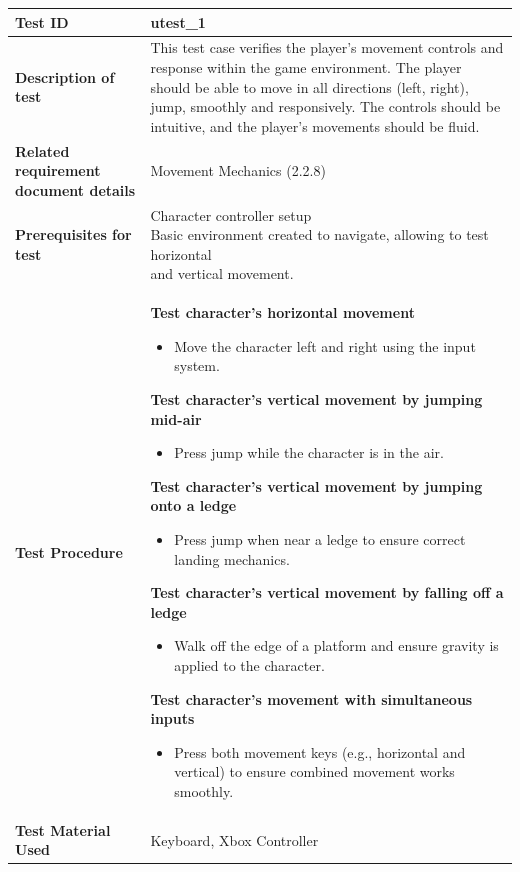 \documentclass[11pt, a4paper]{article}
\begin{document}
\begin{tabularx}{\linewidth}{|>{\raggedright\arraybackslash}m{4cm}|X|}
    \hline
    \textbf{Test ID} & \textbf{utest\_1} \\
    \hline
    \textbf{Description of test} & This test case verifies the player's movement controls and response within the game environment. The player should be able to move in all directions (left, right), jump, smoothly and responsively. The controls should be intuitive, and the player's movements should be fluid. \\
    \hline
    \textbf{Related requirement document details} & Movement Mechanics (2.2.8) \\
    \hline
    \textbf{Prerequisites for test} & \makecell[l]{
        Character controller setup \\
        Basic environment created to navigate, allowing to test horizontal \\ and vertical movement.
    } \\
    \hline
    \textbf{Test Procedure} &
    \textbf{Test character’s horizontal movement}
    \begin{itemize}
        \item Move the character left and right using the input system.
    \end{itemize}
    \textbf{Test character’s vertical movement by jumping mid-air}
    \begin{itemize}
        \item Press jump while the character is in the air.
    \end{itemize}
    \textbf{Test character’s vertical movement by jumping onto a ledge}
    \begin{itemize}
        \item Press jump when near a ledge to ensure correct landing mechanics.
    \end{itemize}
    \textbf{Test character’s vertical movement by falling off a ledge}
    \begin{itemize}
        \item Walk off the edge of a platform and ensure gravity is applied to the character.
    \end{itemize}
    \textbf{Test character’s movement with simultaneous inputs}
    \begin{itemize}
        \item Press both movement keys (e.g., horizontal and vertical) to ensure combined movement works smoothly.
    \end{itemize}
    \\
    \hline
    \textbf{Test Material Used} & Keyboard, Xbox Controller \\
    \hline
\end{tabularx}
\end{document}
